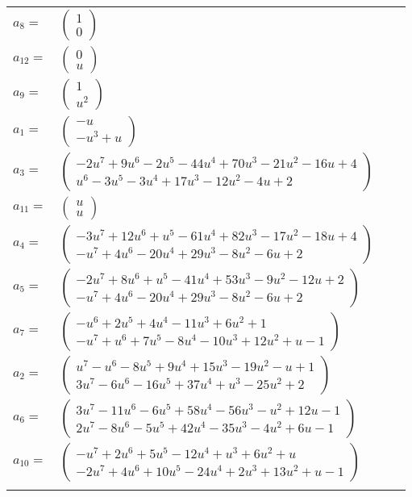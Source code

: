 \documentclass[1p]{elsarticle_modified}
\theoremstyle{definition}
\begin{document}
\begin{tabular}{m{7pt} m{180pt} m{7pt} m{180pt} }
\flushright $a_{8}=$&$\begin{pmatrix}1\\0\end{pmatrix}$ \\
\flushright $a_{12}=$&$\begin{pmatrix}0\\u\end{pmatrix}$ \\
\flushright $a_{9}=$&$\begin{pmatrix}1\\u^2\end{pmatrix}$ \\
\flushright $a_{1}=$&$\begin{pmatrix}- u\\- u^3+u\end{pmatrix}$ \\
\flushright $a_{3}=$&$\begin{pmatrix}-2 u^7+9 u^6-2 u^5-44 u^4+70 u^3-21 u^2-16 u+4\\u^6-3 u^5-3 u^4+17 u^3-12 u^2-4 u+2\end{pmatrix}$ \\
\flushright $a_{11}=$&$\begin{pmatrix}u\\u\end{pmatrix}$ \\
\flushright $a_{4}=$&$\begin{pmatrix}-3 u^7+12 u^6+u^5-61 u^4+82 u^3-17 u^2-18 u+4\\- u^7+4 u^6-20 u^4+29 u^3-8 u^2-6 u+2\end{pmatrix}$ \\
\flushright $a_{5}=$&$\begin{pmatrix}-2 u^7+8 u^6+u^5-41 u^4+53 u^3-9 u^2-12 u+2\\- u^7+4 u^6-20 u^4+29 u^3-8 u^2-6 u+2\end{pmatrix}$ \\
\flushright $a_{7}=$&$\begin{pmatrix}- u^6+2 u^5+4 u^4-11 u^3+6 u^2+1\\- u^7+u^6+7 u^5-8 u^4-10 u^3+12 u^2+u-1\end{pmatrix}$ \\
\flushright $a_{2}=$&$\begin{pmatrix}u^7- u^6-8 u^5+9 u^4+15 u^3-19 u^2- u+1\\3 u^7-6 u^6-16 u^5+37 u^4+u^3-25 u^2+2\end{pmatrix}$ \\
\flushright $a_{6}=$&$\begin{pmatrix}3 u^7-11 u^6-6 u^5+58 u^4-56 u^3- u^2+12 u-1\\2 u^7-8 u^6-5 u^5+42 u^4-35 u^3-4 u^2+6 u-1\end{pmatrix}$ \\
\flushright $a_{10}=$&$\begin{pmatrix}- u^7+2 u^6+5 u^5-12 u^4+u^3+6 u^2+u\\-2 u^7+4 u^6+10 u^5-24 u^4+2 u^3+13 u^2+u-1\end{pmatrix}$\\&\end{tabular}
\end{document}
